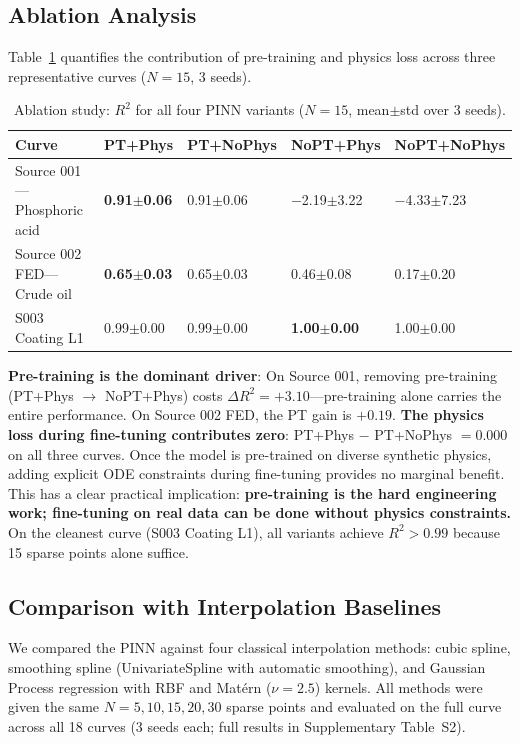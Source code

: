 \documentclass[review]{elsarticle}
\begin{document}
\subsection{Ablation Analysis}
\label{sec:ablation}

Table~\ref{tab:ablation} quantifies the contribution of pre-training and physics loss across three representative curves ($N=15$, 3 seeds).

\begin{table}[htbp]
\centering
\caption{Ablation study: $R^2$ for all four PINN variants ($N=15$, mean$\pm$std over 3 seeds).}
\label{tab:ablation}
\begin{tabular}{@{}p{3.2cm}llll@{}}
\toprule
Curve & PT+Phys & PT+NoPhys & NoPT+Phys & NoPT+NoPhys \\
\midrule
Source 001---Phosphoric acid & \textbf{0.91$\pm$0.06} & 0.91$\pm$0.06 & $-$2.19$\pm$3.22 & $-$4.33$\pm$7.23 \\
Source 002 FED---Crude oil & \textbf{0.65$\pm$0.03} & 0.65$\pm$0.03 & 0.46$\pm$0.08 & 0.17$\pm$0.20 \\
S003 Coating L1 & 0.99$\pm$0.00 & 0.99$\pm$0.00 & \textbf{1.00$\pm$0.00} & 1.00$\pm$0.00 \\
\bottomrule
\end{tabular}
\end{table}

\textbf{Pre-training is the dominant driver}: On Source 001, removing pre-training (PT+Phys $\to$ NoPT+Phys) costs $\Delta R^2 = +3.10$---pre-training alone carries the entire performance. On Source 002 FED, the PT gain is $+0.19$. \textbf{The physics loss during fine-tuning contributes zero}: PT+Phys $-{}$ PT+NoPhys $= 0.000$ on all three curves. Once the model is pre-trained on diverse synthetic physics, adding explicit ODE constraints during fine-tuning provides no marginal benefit. This has a clear practical implication: \textbf{pre-training is the hard engineering work; fine-tuning on real data can be done without physics constraints.} On the cleanest curve (S003 Coating L1), all variants achieve $R^2 > 0.99$ because 15 sparse points alone suffice.

\subsection{Comparison with Interpolation Baselines}

We compared the PINN against four classical interpolation methods: cubic spline, smoothing spline (UnivariateSpline with automatic smoothing), and Gaussian Process regression with RBF and Mat\'{e}rn ($\nu=2.5$) kernels. All methods were given the same $N=5,10,15,20,30$ sparse points and evaluated on the full curve across all 18 curves (3 seeds each; full results in Supplementary Table~S2).
\end{document}
